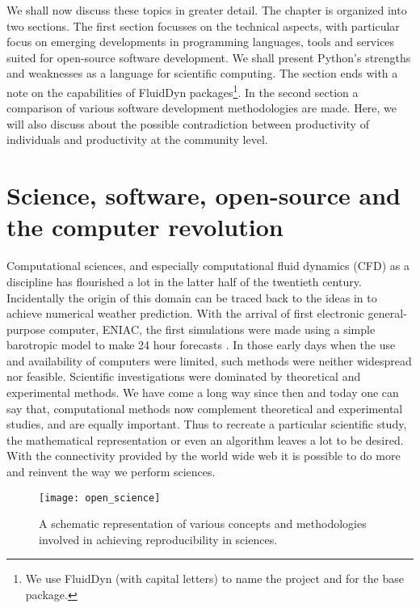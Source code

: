 We shall now discuss these topics in greater detail. The chapter is organized
into two sections. The first section focusses on the technical aspects, with
particular focus on emerging developments in programming languages, tools and
services suited for open-source software development. We shall present Python's
strengths and weaknesses as a language for scientific computing.
%
The section ends with a note on the capabilities of FluidDyn
packages\footnote{We use FluidDyn (with capital letters) to name the project
and \fluiddyn for the base package.}.
%
In the second section a comparison of various software development
methodologies are made. Here, we will also discuss about the possible
contradiction between productivity of individuals and productivity at the
community level.
%

\section{Science, software, open-source and the computer revolution}

Computational sciences, and especially computational fluid dynamics (CFD) as a
discipline has flourished a lot in the latter half of the twentieth century.
Incidentally the origin of this domain can be traced back to the ideas
in \citet{richardson_weather_1922} to achieve numerical weather prediction.
With the arrival of first electronic general-purpose computer, ENIAC, the first
simulations were made using a simple barotropic model to make 24 hour
forecasts \citep{lynch_richardson_2010}. In those early days when the use and
availability of computers were limited, such methods were neither widespread
nor feasible. Scientific investigations were dominated by theoretical and
experimental methods.
We have come a long way since then and today one can say that, computational
methods now complement theoretical and experimental studies, and are equally
important.
Thus to recreate a particular scientific study, the mathematical representation
or even an algorithm leaves a lot to be desired. With the connectivity
provided by the world wide web it is possible to do more and reinvent the way
we perform sciences.

\begin{figure}[h]
  \centering
  \texttt{[image: open\_science]}
  \caption{A schematic representation of various concepts and methodologies
  involved in achieving reproducibility in sciences.}\label{fig:opensci}
\end{figure}

